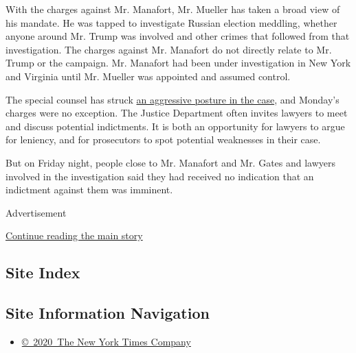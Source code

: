 With the charges against Mr. Manafort, Mr. Mueller has taken a broad
view of his mandate. He was tapped to investigate Russian election
meddling, whether anyone around Mr. Trump was involved and other crimes
that followed from that investigation. The charges against Mr. Manafort
do not directly relate to Mr. Trump or the campaign. Mr. Manafort had
been under investigation in New York and Virginia until Mr. Mueller was
appointed and assumed control.

The special counsel has struck
\href{https://www.nytimes.com/2017/09/18/us/politics/mueller-russia-investigation.html?_r=0}{an
aggressive posture in the case}, and Monday's charges were no exception.
The Justice Department often invites lawyers to meet and discuss
potential indictments. It is both an opportunity for lawyers to argue
for leniency, and for prosecutors to spot potential weaknesses in their
case.

But on Friday night, people close to Mr. Manafort and Mr. Gates and
lawyers involved in the investigation said they had received no
indication that an indictment against them was imminent.

Advertisement

\protect\hyperlink{after-bottom}{Continue reading the main story}

\hypertarget{site-index}{%
\subsection{Site Index}\label{site-index}}

\hypertarget{site-information-navigation}{%
\subsection{Site Information
Navigation}\label{site-information-navigation}}

\begin{itemize}
\tightlist
\item
  \href{https://help.nytimes.com/hc/en-us/articles/115014792127-Copyright-notice}{©~2020~The
  New York Times Company}
\end{itemize}

